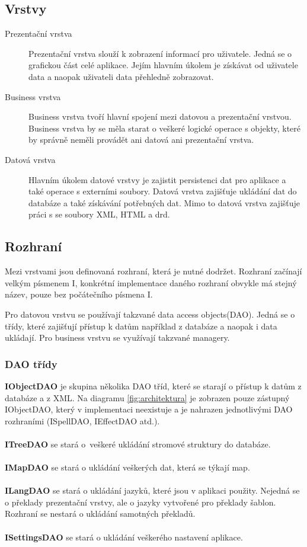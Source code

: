 \documentclass[thesis=B,czech]{resources/FITthesis}[2012/06/26]
\begin{document}
\subsection{Vrstvy}
\begin{description}
	\item[Prezentační vrstva] Prezentační vrstva slouží k zobrazení informací pro uživatele. Jedná se o grafickou část celé aplikace. Jejím hlavním úkolem je získávat od uživatele data a naopak uživateli data přehledně zobrazovat. 
	
	\item[Business vrstva] Business vrstva tvoří hlavní spojení mezi datovou a prezentační vrstvou. Business vrstva by se měla starat o veškeré logické operace s objekty, které by správně neměli provádět ani datová ani prezentační vrstva.
	
	\item[Datová vrstva] Hlavním úkolem datové vrstvy je zajistit persistenci dat pro aplikace a také operace s externími soubory. Datová vrstva zajišťuje ukládání dat do databáze a také získávání potřebných dat. Mimo to datová vrstva zajišťuje práci s se soubory XML, HTML a drd. 
	
\end{description}



\subsection{Rozhraní}
Mezi vrstvami jsou definovaná rozhraní, která je nutné dodržet. Rozhraní začínají velkým písmenem I, konkrétní implementace daného rozhraní obvykle má stejný název, pouze bez počátečního písmena I.\par

Pro datovou vrstvu se používají takzvané \clqq data access objects\crqq (DAO). Jedná se o třídy, které zajišťují přístup k datům například z databáze a naopak i data ukládají. Pro business vrstvu se využívají takzvané \clqq managery\crqq .
\subsubsection*{DAO třídy}
\noindent\textbf{IObjectDAO} je skupina několika DAO tříd, které se starají o přístup k datům z databáze a z XML. Na diagramu \ref{fig:architektura} je zobrazen pouze zástupný IObjectDAO, který v implementaci neexistuje a je nahrazen jednotlivými DAO rozhraními (ISpellDAO, IEffectDAO atd.).\\
\\
\textbf{ITreeDAO} se stará o~veškeré ukládání stromové struktury do databáze. \\
\\
\textbf{IMapDAO} se stará o ukládání veškerých dat, která se týkají map. \\
\\
\textbf{ILangDAO} se stará o ukládání jazyků, které jsou v aplikaci použity. Nejedná se o překlady prezentační vrstvy, ale o jazyky vytvořené pro překlady šablon. Rozhraní se nestará o ukládání samotných překladů.\\
\\
\textbf{ISettingsDAO} se stará o ukládání veškerého nastavení aplikace. 
\end{document}

